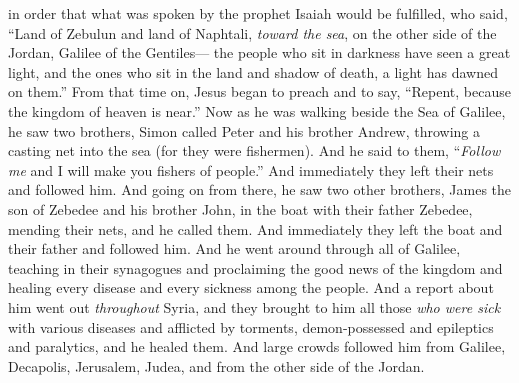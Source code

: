 \begin{biblechapter}
\verse in order that what was spoken by the prophet Isaiah would be fulfilled, who said,
\verse “Land of Zebulun and land of Naphtali, 
\textit{toward the sea}, on the other side of the Jordan, 
Galilee of the Gentiles—
\verse the people who sit in darkness 
have seen a great light, 
and the ones who sit in the land and shadow of death, 
a light has dawned on them.”
\verse From that time on, Jesus began to preach and to say, “Repent, because the kingdom of heaven is near.”
 Now as he was walking beside the Sea of Galilee, he saw two brothers, Simon called Peter and his brother Andrew, throwing a casting net into the sea (for they were fishermen).
\verse And he said to them, “\textit{Follow me} and I will make you fishers of people.”
\verse And immediately they left their nets and followed him.
\verse And going on from there, he saw two other brothers, James the son of Zebedee and his brother John, in the boat with their father Zebedee, mending their nets, and he called them.
\verse And immediately they left the boat and their father and followed him.
 And he went around through all of Galilee, teaching in their synagogues and proclaiming the good news of the kingdom and healing every disease and every sickness among the people.
\verse And a report about him went out \textit{throughout} Syria, and they brought to him all those \textit{who were sick} with various diseases and afflicted by torments, demon-possessed and epileptics and paralytics, and he healed them.
\verse And large crowds followed him from Galilee, Decapolis, Jerusalem, Judea, and from the other side of the Jordan.
\end{biblechapter}

